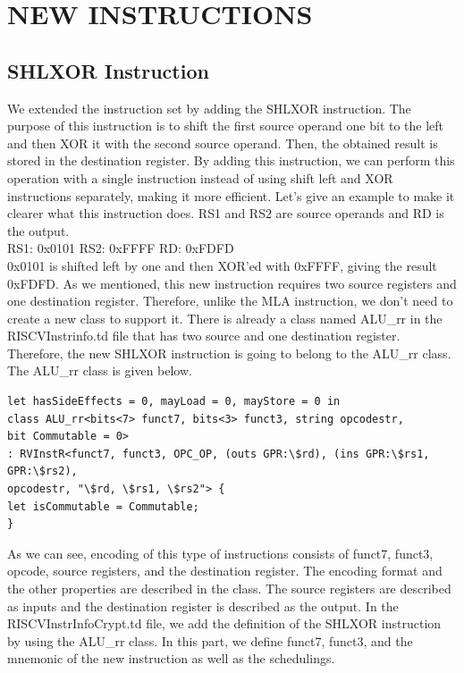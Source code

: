 \clearpage
\chapter{NEW INSTRUCTIONS}\label{Ch9}

\section{SHLXOR Instruction}
We extended the instruction set by adding the SHLXOR instruction. The purpose of this instruction is to shift the first source operand one bit to the left and then XOR it with the second source operand. Then, the obtained result is stored in the destination register. By adding this instruction, we can perform this operation with a single instruction instead of using shift left and XOR instructions separately, making it more efficient.
Let’s give an example to make it clearer what this instruction does. RS1 and RS2 are source operands and RD is the output.
\\
RS1: 0x0101     RS2: 0xFFFF     RD: 0xFDFD
\\
0x0101 is shifted left by one and then XOR’ed with 0xFFFF, giving the result 0xFDFD.
As we mentioned, this new instruction requires two source registers and one destination register. Therefore, unlike the MLA instruction, we don’t need to create a new class to support it. There is already a class named ALU\_rr in the RISCVInstrinfo.td file that has two source and one destination register. Therefore, the new SHLXOR instruction is going to belong to the ALU\_rr class. The ALU\_rr class is given below.

\begin{lstlisting}
let hasSideEffects = 0, mayLoad = 0, mayStore = 0 in
class ALU_rr<bits<7> funct7, bits<3> funct3, string opcodestr,
bit Commutable = 0>
: RVInstR<funct7, funct3, OPC_OP, (outs GPR:\$rd), (ins GPR:\$rs1, GPR:\$rs2),
opcodestr, "\$rd, \$rs1, \$rs2"> {
let isCommutable = Commutable;
}
\end{lstlisting}

As we can see, encoding of this type of instructions consists of funct7, funct3, opcode, source registers, and the destination register. The encoding format and the other properties are described in the class. The source registers are described as inputs and the destination register is described as the output.
In the RISCVInstrInfoCrypt.td file, we add the definition of the SHLXOR instruction by using the ALU\_rr class. In this part, we define funct7, funct3, and the mnemonic of the new instruction as well as the schedulings.

